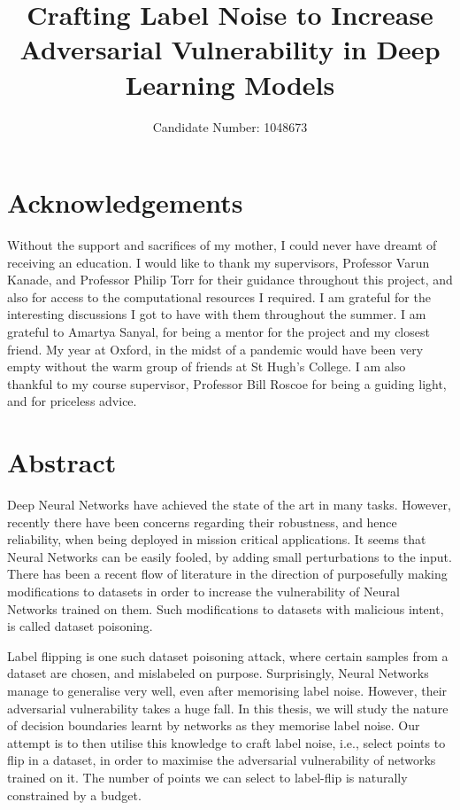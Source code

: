\documentclass{ociamthesis}
\title{Crafting Label Noise to Increase Adversarial Vulnerability in Deep
Learning Models}
\author{Candidate Number: 1048673}
\date{}
\begin{document}
\maketitle

\chapter*{Acknowledgements}
Without the support and sacrifices of my mother, I could never have dreamt of
receiving an education. I would like to thank my supervisors, Professor Varun
Kanade, and Professor Philip Torr for their guidance throughout this project,
and also for access to the computational resources I required. I am grateful for
the interesting discussions I got to have with them throughout the summer. I am
grateful to Amartya Sanyal, for being a mentor for the project and my closest
friend. My year at Oxford, in the midst of a pandemic would have been very empty
without the warm group of friends at St Hugh's College. I am also thankful to my
course supervisor, Professor Bill Roscoe for being a guiding light, and for
priceless advice.

\chapter*{Abstract}
Deep Neural Networks have achieved the state of the art in many tasks. However,
recently there have been concerns regarding their robustness, and hence
reliability, when being deployed in mission critical applications. It seems that
Neural Networks can be easily fooled, by adding small perturbations to the
input. There has been a recent flow of literature in the direction of
purposefully making modifications to datasets in order to increase the
vulnerability of Neural Networks trained on them. Such modifications to datasets
with malicious intent, is called dataset poisoning.

Label flipping is one such dataset poisoning attack, where certain samples from
a dataset are chosen, and mislabeled on purpose. Surprisingly, Neural Networks
manage to generalise very well, even after memorising label noise. However,
their adversarial vulnerability takes a huge fall. In this thesis, we will study
the nature of decision boundaries learnt by networks as they memorise label
noise. Our attempt is to then utilise this knowledge to craft label noise, i.e.,
select points to flip in a dataset, in order to maximise the adversarial
vulnerability of networks trained on it. The number of points we can select to
label-flip is naturally constrained by a budget. 
\end{document}
